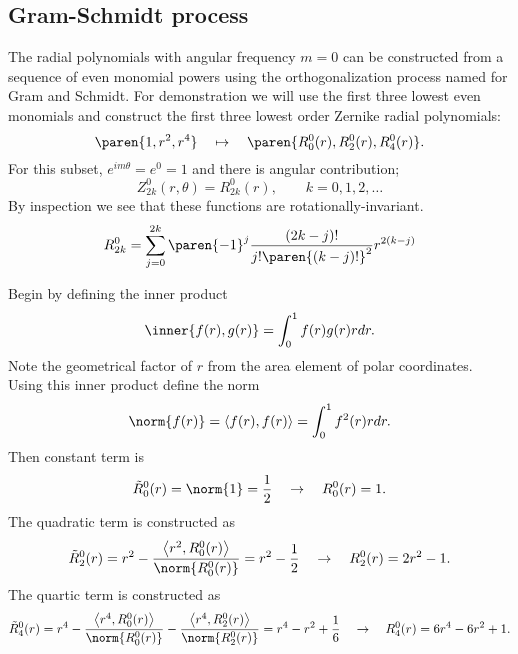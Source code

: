 \subsection{Gram-Schmidt process}
The radial polynomials with angular frequency $m=0$ can be constructed from a sequence of even monomial powers using the orthogonalization process named for Gram and Schmidt. For demonstration we will use the first three lowest even monomials and construct the first three lowest order Zernike radial polynomials:
\begin{equation*}
  \paren{1,r^{2},r^{4}} \quad \mapsto \quad \paren{R_{0}^{0}(r), R_{2}^{0}(r), R_{4}^{0}(r)}.
\end{equation*}
For this subset, $e^{im\theta} = e^{0} = 1$ and there is angular contribution;
\begin{equation}
  Z_{2k}^{0}(r,\theta) = R_{2k}^{0}(r), \qquad k = 0,1,2,\dots
\end{equation}
By inspection we see that these functions are rotationally-invariant.
\begin{equation}
  R_{2k}^{0} = \sum_{j=0}^{2k} { \paren{-1}^{j} \frac{(2k-j)!} {j! \paren{(k-j)!}^{2}} r^{2(k-j)}}
\label{eq:recursion}
\end{equation}

Begin by defining the inner product
\begin{equation*}
  \inner{f(r), g(r)} = \int_{0}^{1} f(r) g(r) r dr.
\end{equation*}
Note the geometrical factor of $r$ from the area element of polar coordinates. Using this inner product define the norm
\begin{equation*}
  \norm{f(r)} = \left< f(r), f(r) \right> = \int_{0}^{1} f^{2}(r) r dr.
\end{equation*}
Then constant term is
\begin{equation*}
  \tilde{R}_{0}^{0}(r) = \norm{1} = \frac{1} {2} \quad \to \quad R_{0}^{0}(r) = 1.
\end{equation*}
The quadratic term is constructed as
\begin{equation*}
  \tilde{R}_{2}^{0}(r) = r^{2} - \frac{ \left< r^{2}, R_{0}^{0}(r) \right> } {\norm{R_{0}^{0}(r)}} = r^{2} - \frac{1} {2} \quad \to \quad R_{2}^{0}(r) = 2r^{2} - 1.
\end{equation*}
The quartic term is constructed as
\begin{equation*}
  \tilde{R}_{4}^{0}(r) = r^{4} - \frac{ \left< r^{4}, R_{0}^{0}(r) \right> } {\norm{R_{0}^{0}(r)}} - \frac{ \left< r^{4}, R_{2}^{0}(r) \right> } {\norm{R_{2}^{0}(r)}} = r^{4} - r^{2} + \frac{1} {6} \quad \to \quad R_{4}^{0}(r) = 6r^{4} - 6r^{2} + 1.
\end{equation*}
%

